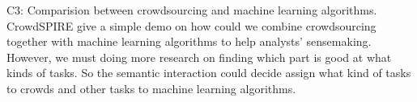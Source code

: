 \documentclass[journal]{vgtc}                %
\begin{document}
C3: Comparision between crowdsourcing and machine learning algorithms.
CrowdSPIRE give a simple demo on how could we combine crowdsourcing together with machine learning algorithms to help analysts' sensemaking.
However, we must doing more research on finding which part is good at what kinds of tasks.
So the semantic interaction could decide assign what kind of tasks to crowds and other tasks to machine learning algorithms.


%

%
%
%


\end{document}
